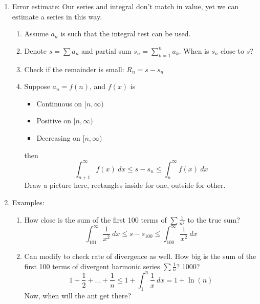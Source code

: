 \documentclass{article}
\begin{document}
\begin{enumerate}
\item Error estimate: Our series and integral don't match in value, yet we can estimate a series in this way.
\begin{enumerate}
\item Assume $a_n$ is such that the integral test can be used.
\item Denote $s = \sum a_n$ and partial sum $s_n = \sum_{k=1}^n a_k$. When is $s_n$ close to $s$?
\item Check if the remainder is small:  $R_n = s - s_n$
\item Suppose $a_n = f(n)$, and $f(x)$ is
\begin{itemize}
\item Continuous on $[n,\infty)$
\item Positive on $[n,\infty)$
\item Decreasing on $[n,\infty)$
\end{itemize}
then 
$$
\int_{n+1}^\infty f(x)~dx\leq s-s_n \leq \int_n^\infty f(x)~dx
$$
Draw a picture here, rectangles inside for one, outside for other.
\end{enumerate}

\item Examples: 
\begin{enumerate}
\item How close is the sum of the first 100 terms of $\sum \frac{1}{n^2}$ to the true sum?
\[
\int_{101}^{\infty} \frac{1}{x^2}~dx \leq s-s_{100} \leq \int_{100}^{\infty} \frac{1}{x^2}~dx 
\]
\item Can modify to check rate of divergence as well. How big is the sum of the first 100 terms of divergent harmonic series $\sum \frac{1}{n}$? 1000? 
\[
1 + \frac{1}{2} + \dots + \frac{1}{n} \leq 1 + \int_1^n \frac{1}{x}~dx = 1+\ln(n)
\]
Now, when will the ant get there?
\end{enumerate}
\end{enumerate}


\end{document}
